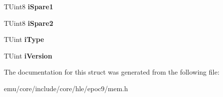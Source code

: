 \begin{DoxyCompactItemize}
\mbox{\label{struct_t_chunk_create_info_a2af4266e27a4b88fb65d1c2850b9c2a9}} 
T\+Uint8 {\bfseries i\+Spare1}
\item 
\mbox{\label{struct_t_chunk_create_info_afd4a641e3d5857de6a702d3bbed4f0d1}} 
T\+Uint8 {\bfseries i\+Spare2}
\item 
\mbox{\label{struct_t_chunk_create_info_a8ba8772178531e50214bec424ff2e3ca}} 
T\+Uint {\bfseries i\+Type}
\item 
\mbox{\label{struct_t_chunk_create_info_a4bf7b3f4803a2e3501e47efb26e384df}} 
T\+Uint {\bfseries i\+Version}
\end{DoxyCompactItemize}


The documentation for this struct was generated from the following file\+:\begin{DoxyCompactItemize}
\item 
emu/core/include/core/hle/epoc9/mem.\+h\end{DoxyCompactItemize}
